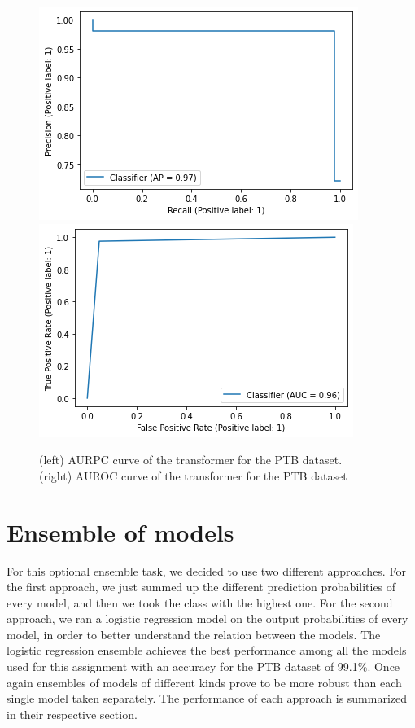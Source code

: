 \documentclass[11pt]{scrartcl}
\begin{document}
\begin{figure}[htp]
\centering
\includegraphics[width=.50\textwidth]{../models_performance_graphs/ptb/transformer_ptb_auprc.png}\hfill
\includegraphics[width=.50\textwidth]{../models_performance_graphs/ptb/transformer_ptb_auroc.png}\hfill
\caption{(left) AURPC curve of the transformer for the PTB dataset. \\ (right) AUROC curve of the transformer for the PTB dataset}
\label{fig:transformer_ptb_two}
\end{figure}








\section{Ensemble of models}
For this optional ensemble task, we decided to use two different approaches. For the first approach, we just summed up the different prediction probabilities of every model, and then we took the class with the highest one. For the second approach, we ran a logistic regression model on the output probabilities of every model, in order to better understand the relation between the models. 
The logistic regression ensemble achieves the best performance among all the models used for this assignment with an accuracy for the PTB dataset of 99.1\%. Once again ensembles of models of different kinds prove to be more robust than each single model taken separately.
The performance of each approach is summarized in their respective section.
\end{document}
